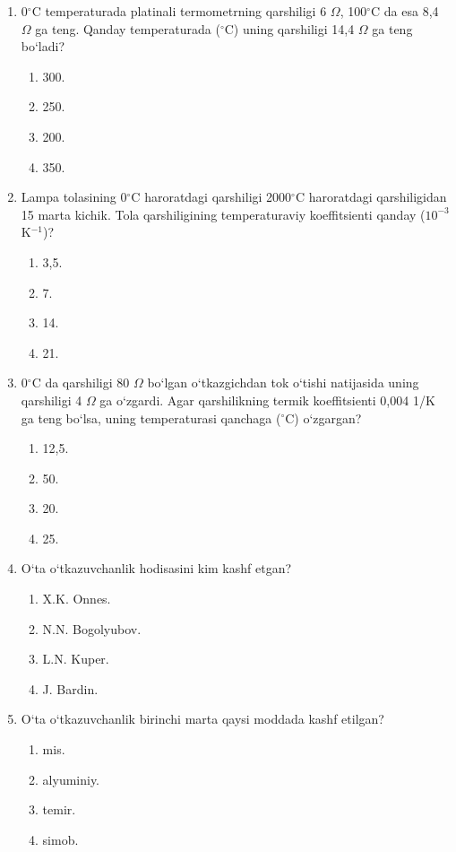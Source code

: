 \begin{enumerate}
\item 0$^\circ$C temperaturada platinali termometrning qarshiligi 6 $\Omega$, 100$^\circ$C da esa 8,4 $\Omega$ ga teng. Qanday temperaturada ($^\circ$C) uning qarshiligi 14,4 $\Omega$ ga teng bo‘ladi?
\begin{enumerate}[label=\Alph*)]
\item 300.
\item 250.
\item 200.
\item 350.
\end{enumerate}

\item Lampa tolasining 0$^\circ$C haroratdagi qarshiligi 2000$^\circ$C haroratdagi qarshiligidan 15 marta kichik. Tola qarshiligining temperaturaviy koeffitsienti qanday ($10^{-3}$ K$^{-1}$)?
\begin{enumerate}[label=\Alph*)]
\item 3,5.
\item 7.
\item 14.
\item 21.
\end{enumerate}

\item 0$^\circ$C da qarshiligi 80 $\Omega$ bo‘lgan o‘tkazgichdan tok o‘tishi natijasida uning qarshiligi 4 $\Omega$ ga o‘zgardi. Agar qarshilikning termik koeffitsienti 0,004 1/K ga teng bo‘lsa, uning temperaturasi qanchaga ($^\circ$C) o‘zgargan?
\begin{enumerate}[label=\Alph*)]
\item 12,5.
\item 50.
\item 20.
\item 25.
\end{enumerate}

\item O‘ta o‘tkazuvchanlik hodisasini kim kashf etgan?
\begin{enumerate}[label=\Alph*)]
\item X.K. Onnes.
\item N.N. Bogolyubov.
\item L.N. Kuper.
\item J. Bardin.
\end{enumerate}

\item O‘ta o‘tkazuvchanlik birinchi marta qaysi moddada kashf etilgan?
\begin{enumerate}[label=\Alph*)]
\item mis.
\item alyuminiy.
\item temir.
\item simob.
\end{enumerate}



\end{enumerate}


